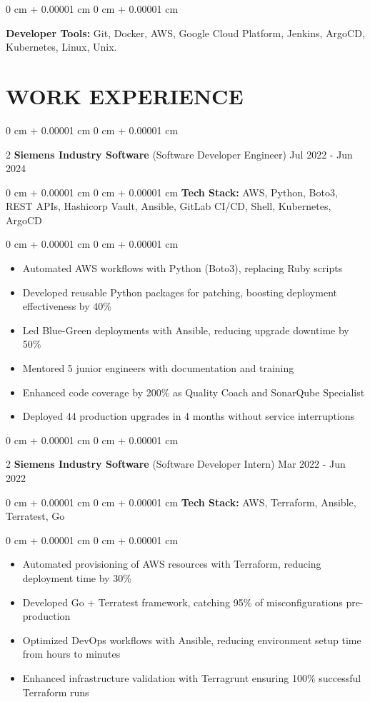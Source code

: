 \documentclass[9pt, letterpaper]{article}
\newenvironment{highlights}{
    \begin{itemize}[
        topsep=0.05 cm,
        parsep=0 pt,
        partopsep=0pt,
        itemsep=0pt,
        leftmargin=10pt
    ]
}{
    \end{itemize}
} %
\newenvironment{onecolentry}{
    \begin{adjustwidth}{
        0 cm + 0.00001 cm}{
        0 cm + 0.00001 cm}
}{
    \end{adjustwidth}
} %
\newenvironment{twocolentry}[2][]{
    \onecolentry
    \def\secondColumn{#2}
    \setcolumnwidth{\fill, 4.5 cm}
    \begin{paracol}{2}
}{
    \switchcolumn \raggedleft \secondColumn
    \end{paracol}
    \endonecolentry
} %
\begin{document}
    \begin{onecolentry}
    \textbf{Developer Tools:} Git, Docker, AWS, Google Cloud Platform, Jenkins, ArgoCD, Kubernetes, Linux, Unix.
    \end{onecolentry}


\section{WORK EXPERIENCE}

    \begin{twocolentry}{Jul 2022 - Jun 2024}\textbf{Siemens Industry Software} (Software Developer Engineer)\end{twocolentry}
    \begin{onecolentry}\textbf{Tech Stack:} AWS, Python, Boto3, REST APIs, Hashicorp Vault, Ansible, GitLab CI/CD, Shell, Kubernetes, ArgoCD \end{onecolentry}
    \begin{onecolentry}
        \begin{highlights}
            \item Automated AWS workflows with Python (Boto3), replacing Ruby scripts
            \item Developed reusable Python packages for patching, boosting deployment effectiveness by 40\%
            \item Led Blue-Green deployments with Ansible, reducing upgrade downtime by 50\%
            \item Mentored 5 junior engineers with documentation and training
            \item Enhanced code coverage by 200\% as Quality Coach and SonarQube Specialist
            \item Deployed 44 production upgrades in 4 months without service interruptions
        \end{highlights}
    \end{onecolentry}

    \begin{twocolentry}{Mar 2022 - Jun 2022}\textbf{Siemens Industry Software} (Software Developer Intern)\end{twocolentry}
    \begin{onecolentry}\textbf{Tech Stack:} AWS, Terraform, Ansible, Terratest, Go \end{onecolentry}
    \begin{onecolentry}
        \begin{highlights}
            \item Automated provisioning of AWS resources with Terraform, reducing deployment time by 30\%
            \item Developed Go + Terratest framework, catching 95\% of misconfigurations pre-production
            \item Optimized DevOps workflows with Ansible, reducing environment setup time from hours to minutes
            \item Enhanced infrastructure validation with Terragrunt ensuring 100\% successful Terraform runs
        \end{highlights}
    \end{onecolentry}
\end{document}
